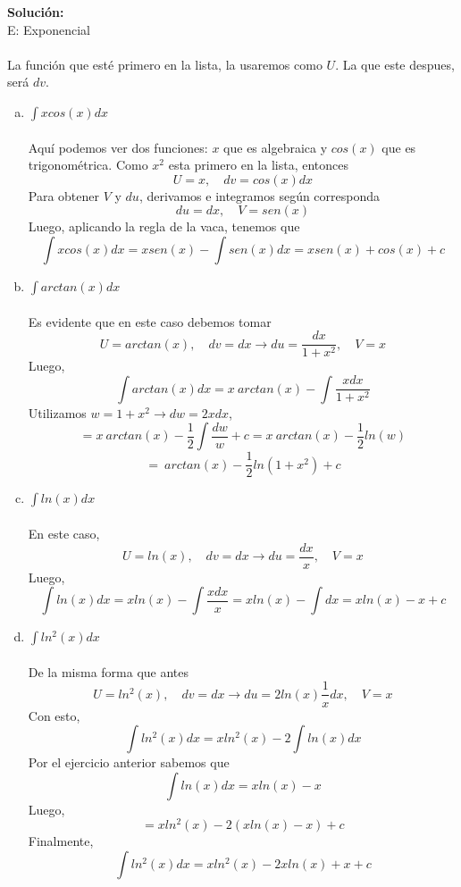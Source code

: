 \documentclass[12pt]{article}
\newenvironment{solucion}
{\begin{mdframed}[backgroundcolor=black!10]
		{\bf Solución:}\\
	}
	{
	\end{mdframed}
}
\newenvironment{preguntas}
{\begin{enumerate}\itemsep12pt
	}
	{
	\end{enumerate}
}
\newcommand{\ra}{\rightarrow}
\begin{document}
\begin{preguntas}
\begin{solucion}
		E: Exponencial\\\\
		La función que esté primero en la lista, la usaremos como $U$. La que este despues, será $dv$.
\begin{enumerate}[a)]
\item $\displaystyle\int xcos(x)dx$\\\\
			Aquí podemos ver dos funciones: $x$ que es algebraica y $cos(x)$ que es trigonométrica. Como $x^2$ esta primero en la lista, entonces
			$$U = x, \quad dv = cos(x)dx$$
			Para obtener $V$ y $du$, derivamos e integramos según corresponda
			$$du = dx, \quad V = sen(x)$$
			Luego, aplicando la regla de la vaca, tenemos que
			$$\displaystyle\int xcos(x)dx = xsen(x) - \displaystyle\int sen(x)dx = xsen(x) +cos(x) + c $$
\item $\displaystyle\int arctan(x)dx$\\\\
			Es evidente que en este caso debemos tomar
			$$U = arctan(x), \quad dv = dx \ra du = \dfrac{dx}{1+x^2}, \quad V = x$$
			Luego,
			$$\displaystyle\int arctan(x)dx 
			= x\ arctan(x) - \displaystyle\int \dfrac{xdx}{1+x^2} $$
			Utilizamos $w = 1+x^2 \ra dw = 2xdx$, 
			$$= x\ arctan(x) - \dfrac{1}{2}\displaystyle\int \dfrac{dw}{w} + c
			= x\ arctan(x) - \dfrac{1}{2}ln(w)$$
			$$= \ arctan(x) - \dfrac{1}{2}ln(1+x^2) + c$$
\item $\displaystyle\int ln(x)dx$\\\\
			En este caso,
			$$U = ln(x), \quad dv = dx \ra du = \dfrac{dx}{x}, \quad V = x$$
			Luego, 
			$$\displaystyle\int ln(x)dx
			= xln(x) - \displaystyle\int \dfrac{xdx}{x}
			= xln(x) - \displaystyle\int dx
			= xln(x) - x + c
			$$
\item $\displaystyle\int ln^2(x)dx$\\\\
			De la misma forma que antes
			$$U = ln^2(x), \quad dv = dx \ra du = 2ln(x)\dfrac{1}{x}dx, \quad V = x$$
			Con esto,
			$$\displaystyle\int ln^2(x)dx = xln^2(x) - 2\displaystyle\int ln(x)dx$$
			Por el ejercicio anterior sabemos que
			$$\displaystyle\int ln(x)dx = xln(x) -x$$
			Luego,
			$$=xln^2(x) - 2(xln(x) - x) + c$$
			Finalmente,
			$$\displaystyle\int ln^2(x)dx = xln^2(x) - 2xln(x) + x + c$$
\end{enumerate}
\end{solucion}
\end{preguntas}
\end{document}
